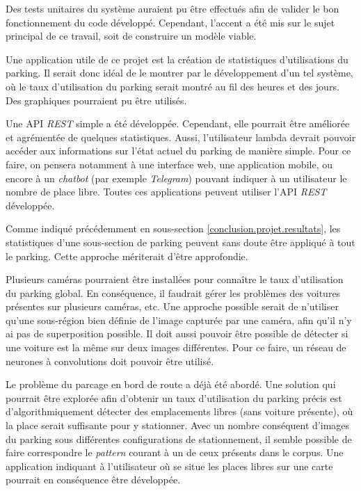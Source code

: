 Des tests unitaires du système auraient pu être effectués afin de valider le bon fonctionnement du code développé. Cependant, l'accent a été mis sur le sujet principal de ce travail, soit de construire un modèle viable.

Une application utile de ce projet est la création de statistiques d'utilisations du parking. Il serait donc idéal de le montrer par le développement d'un tel système, où le taux d'utilisation du parking serait montré au fil des heures et des jours. Des graphiques pourraient pu être utilisés.

Une API \textit{REST} simple a été développée. Cependant, elle pourrait être améliorée et agrémentée de quelques statistiques. Aussi, l'utilisateur lambda devrait pouvoir accéder aux informations sur l'état actuel du parking de manière simple. Pour ce faire, on pensera notamment à une interface web, une application mobile, ou encore à un \textit{chatbot} (par exemple \textit{Telegram}) pouvant indiquer à un utilisateur le nombre de place libre. Toutes ces applications peuvent utiliser l'API \textit{REST} développée. 

Comme indiqué précédemment en sous-section \ref{conclusion.projet.resultats}, les statistiques d'une sous-section de parking peuvent sans doute être appliqué à tout le parking. Cette approche mériterait d'être approfondie.

Plusieurs caméras pourraient être installées pour connaître le taux d'utilisation du parking global. En conséquence, il faudrait gérer les problèmes des voitures présentes sur plusieurs caméras, etc. Une approche possible serait de n'utiliser qu'une sous-région bien définie de l'image capturée par une caméra, afin qu'il n'y ai pas de superposition possible. Il doit aussi pouvoir être possible de détecter si une voiture est la même sur deux images différentes. Pour ce faire, un réseau de neurones à convolutions doit pouvoir être utilisé.

Le problème du parcage en bord de route a déjà été abordé. Une solution qui pourrait être explorée afin d'obtenir un taux d'utilisation du parking précis est d'algorithmiquement détecter des emplacements libres (sans voiture présente), où la place serait suffisante pour y stationner. Avec un nombre conséquent d'images du parking sous différentes configurations de stationnement, il semble possible de faire correspondre le \textit{pattern} courant à un de ceux présents dans le corpus. Une application indiquant à l'utilisateur où se situe les places libres sur une carte pourrait en conséquence être développée.

